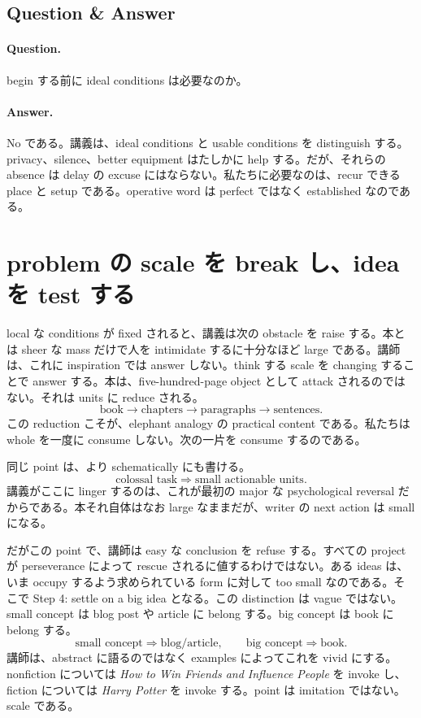 \subsection{Question \& Answer}

\paragraph{Question.} begin する前に ideal conditions は必要なのか。

\paragraph{Answer.} No である。講義は、ideal conditions と usable conditions を distinguish する。privacy、silence、better equipment はたしかに help する。だが、それらの absence は delay の excuse にはならない。私たちに必要なのは、recur できる place と setup である。operative word は perfect ではなく established なのである。

\section{problem の scale を break し、idea を test する}

local な conditions が fixed されると、講義は次の obstacle を raise する。本とは sheer な mass だけで人を intimidate するに十分なほど large である。講師は、これに inspiration では answer しない。think する scale を changing することで answer する。本は、five-hundred-page object として attack されるのではない。それは units に reduce される。
\begin{equation}
\text{book} \to \text{chapters} \to \text{paragraphs} \to \text{sentences}.
\end{equation}
この reduction こそが、elephant analogy の practical content である。私たちは whole を一度に consume しない。次の一片を consume するのである。

同じ point は、より schematically にも書ける。
\begin{equation}
\text{colossal task} \Rightarrow \text{small actionable units}.
\end{equation}
講義がここに linger するのは、これが最初の major な psychological reversal だからである。本それ自体はなお large なままだが、writer の next action は small になる。

だがこの point で、講師は easy な conclusion を refuse する。すべての project が perseverance によって rescue されるに値するわけではない。ある ideas は、いま occupy するよう求められている form に対して too small なのである。そこで Step 4: settle on a big idea となる。この distinction は vague ではない。small concept は blog post や article に belong する。big concept は book に belong する。
\begin{equation}
\text{small concept} \Rightarrow \text{blog/article}, \qquad
\text{big concept} \Rightarrow \text{book}.
\end{equation}
講師は、abstract に語るのではなく examples によってこれを vivid にする。nonfiction については \textit{How to Win Friends and Influence People} を invoke し、fiction については \textit{Harry Potter} を invoke する。point は imitation ではない。scale である。

